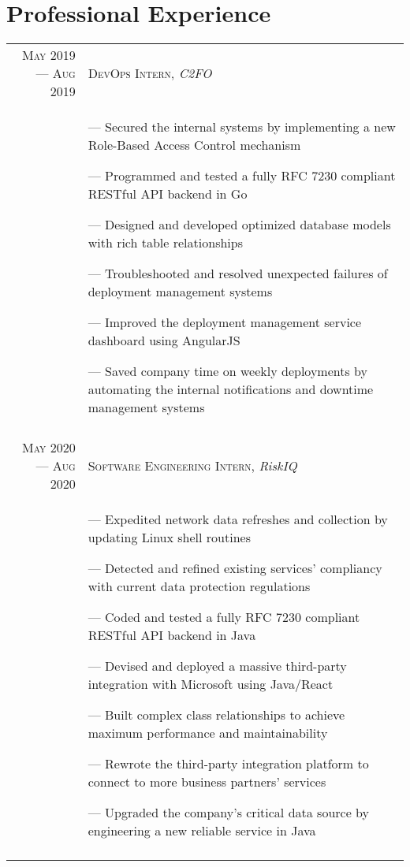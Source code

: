 \documentclass[a4paper, 10pt]{article}
\begin{document}
\section{Professional Experience}
\begin{tabular}{r|p{12cm}}

	\textsc{May 2019 --- Aug 2019} & \textsc{DevOps Intern}, \emph{C2FO}                                                         \\&\footnotesize{
		--- Secured the internal systems by implementing a new Role-Based Access Control mechanism

		--- Programmed and tested a fully RFC 7230 compliant RESTful API backend in Go

		--- Designed and developed optimized database models with rich table relationships

		--- Troubleshooted and resolved unexpected failures of deployment management systems

		--- Improved the deployment management service dashboard using AngularJS

		--- Saved company time on weekly deployments by automating the internal notifications and downtime management systems
	}                                                                                                                            \\\multicolumn{2}{c}{}\\

	\textsc{May 2020 --- Aug 2020} & \textsc{Software Engineering Intern}, \emph{RiskIQ}                                         \\&\footnotesize{
		--- Expedited network data refreshes and collection by updating Linux shell routines

		--- Detected and refined existing services' compliancy with current data protection regulations

		--- Coded and tested a fully RFC 7230 compliant RESTful API backend in Java

		--- Devised and deployed a massive third-party integration with Microsoft using Java/React

		--- Built complex class relationships to achieve maximum performance and maintainability

		--- Rewrote the third-party integration platform to connect to more business partners' services

		--- Upgraded the company's critical data source by engineering a new reliable service in Java
	}                                                                                                                            \\\multicolumn{2}{c}{}\\


\end{tabular}
\end{document}
